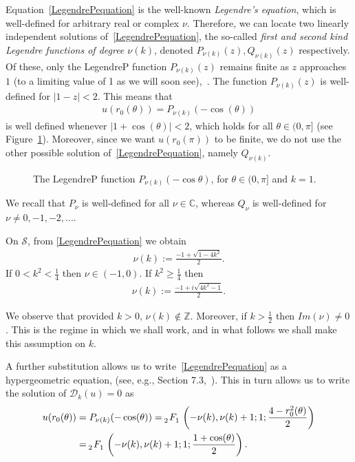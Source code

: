\documentclass[final]{siamltex}
\renewcommand{\S} {\mathcal{S}}
\begin{document}
Equation~\eqref{LegendrePequation} is the well-known {\it Legendre's
equation}, which is well-defined for arbitrary real or complex $\nu$.
Therefore, we can locate two linearly independent solutions
of~\eqref{LegendrePequation}, the so-called {\it first and second kind
Legendre functions of degree $\nu(k)$}, denoted $ P_{\nu(k)}(z),
Q_{\nu(k)}(z)$ respectively. Of these, only the  LegendreP function
$P_{\nu(k)}(z)$ remains finite as $z$ approaches $1$ (to a limiting value of 1
as we will soon see),~\cite{lebedev}.  The function $P_{\nu(k)}(z)$ is
well-defined for $|1-z|<2$.  This means that
\begin{align*}
  u(r_0(\theta)) =  P_{\nu(k)}(-\cos(\theta))
\end{align*}
is well defined whenever $|1+\cos(\theta)|<2$, which holds for all
$\theta \in(0,\pi]$ (see Figure~\ref{f:legendreP}).  Moreover, since we
want $u(r_0(\pi))$ to be finite, we do not use the other possible
solution of~\eqref{LegendrePequation}, namely $Q_{\nu(k)}$.
\begin{figure}[htps]
  \centering
  
  \caption{\label{f:legendreP} The LegendreP function
  $P_{\nu(k)}(-\cos\theta)$, for $\theta \in (0,\pi]$ and $k=1$.}
\end{figure}  

We recall that $P_{\nu}$ is well-defined for all $\nu \in \mathbb{C}$, whereas $Q_\nu$ is well-defined for $\nu \not= 0,-1,-2,...$. 

On $\S$, from \eqref{LegendrePequation} we obtain\begin{align*}  
  \nu(k):=\frac{-1+\sqrt{1-4k^2}}{2}.
\end{align*}
If $0<k^2<\frac{1}{4}$ then $\nu \in (-1,0)$. If $k^2\geq\frac{1}{4}$ then 
\begin{align*}  
  \nu(k):=\frac{-1+i\sqrt{4k^2-1}}{2}.
\end{align*}

We observe that provided $k>0$, $\nu(k) \notin \mathbb{Z}$. Moreover, if $k>\frac{1}{2}$ then $Im(\nu)\not=0$. This is the regime in which we shall work, and in
what follows we shall make this assumption on $k$.



A further substitution allows us to write~\eqref{LegendrePequation} as a
hypergeometric equation, (see, e.g., Section 7.3,~\cite{lebedev}). This
in turn allows us to write the solution of $\mathcal{D}_k(u)=0$ as 
\begin{align*} 
  u(r_0(\theta)) &= P_{\nu(k)}(-\cos(\theta)) = 
    \tensor[_2]{F}{_1}\left(-\nu(k), \nu(k)+  1; 1; 
      \frac{4-r_0^2(\theta)}{2}\right) \\
    &=\tensor[_2]{F}{_1}\left(-\nu(k), \nu(k)+  1; 1;
    \frac{1+\cos(\theta)}{2}\right).
\end{align*} 
\end{document}
